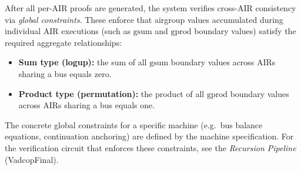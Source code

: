 After all per-AIR proofs are generated, the system verifies cross-AIR
consistency via \emph{global constraints}.
These enforce that airgroup values accumulated during individual AIR
executions (such as $\mathrm{gsum}$ and $\mathrm{gprod}$ boundary values)
satisfy the required aggregate relationships:

\begin{itemize}[nosep]
  \item \textbf{Sum type (logup):}
        the sum of all $\mathrm{gsum}$ boundary values across AIRs sharing a bus equals zero.
  \item \textbf{Product type (permutation):}
        the product of all $\mathrm{gprod}$ boundary values across AIRs sharing a bus equals one.
\end{itemize}

The concrete global constraints for a specific machine
(e.g.\ bus balance equations, continuation anchoring)
are defined by the machine specification.
For the verification circuit that enforces these constraints,
see the \emph{Recursion Pipeline} (VadcopFinal).

